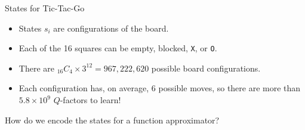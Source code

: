 \documentclass[9pt]{beamer}
\newcommand\pskip{\pause\bigskip}
\begin{document}
\begin{frame}{States for Tic-Tac-Go}

\begin{itemize}
	\item States $s_i$ are configurations of the board.
	\item Each of the 16 squares can be empty, blocked, \texttt{X}, or \texttt{O}.
	\item There are $_{16}C_4 \times 3^{12} = 967,222,620$ possible board configurations.
	\item Each configuration has, on average, $6$ possible moves, so there are more than $5.8\times10^{9}$ $Q$-factors to learn!
\end{itemize}

\pskip
How do we encode the states for a function approximator?

\end{frame}
\end{document}
